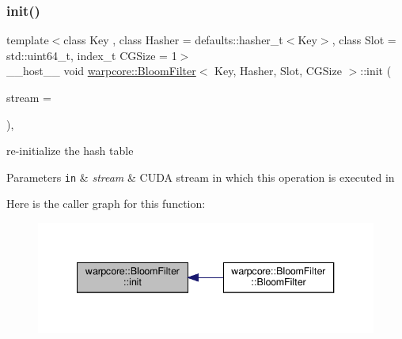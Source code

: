 \subsubsection{\texorpdfstring{init()}{init()}}
{\footnotesize\ttfamily template$<$class Key , class Hasher  = defaults\+::hasher\+\_\+t$<$\+Key$>$, class Slot  = std\+::uint64\+\_\+t, index\+\_\+t C\+G\+Size = 1$>$ \\
\+\_\+\+\_\+host\+\_\+\+\_\+ void \hyperlink{classwarpcore_1_1BloomFilter}{warpcore\+::\+Bloom\+Filter}$<$ Key, Hasher, Slot, C\+G\+Size $>$\+::init (\begin{DoxyParamCaption}\item[{cuda\+Stream\+\_\+t}]{stream = {} }\end{DoxyParamCaption})\hspace{0.3cm}{\ttfamily [inline]}, {\ttfamily [noexcept]}}



re-\/initialize the hash table 


\begin{DoxyParams}[1]{Parameters}
\mbox{\tt in}  & {\em stream} & C\+U\+DA stream in which this operation is executed in \\
\hline
\end{DoxyParams}
Here is the caller graph for this function\+:
\nopagebreak
\begin{figure}[H]
\begin{center}
\leavevmode
\includegraphics[width=340pt]{classwarpcore_1_1BloomFilter_ac9e663f21e94822fc214b75c623436f5_icgraph}
\end{center}
\end{figure}
\mbox{\label{classwarpcore_1_1BloomFilter_a8567325cd30886f3daf2c615a35bb02e}} 
